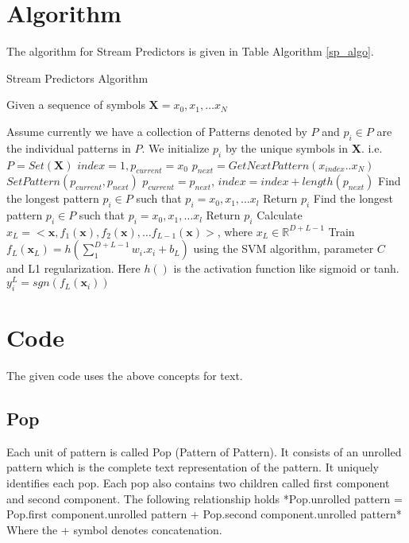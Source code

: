 \documentclass[fleqn,10pt]{olplainarticle}
\begin{document}
\section*{Algorithm}
The algorithm for Stream Predictors is given in Table Algorithm \ref{sp_algo}.
\begin{algorithm}
\caption{Stream Predictors Algorithm}
\label{sp_algo}
\begin{algorithmic}[1]
\State Given a sequence of symbols $\textbf{X} = x_0, x_1, \ldots x_N$

\State Assume currently we have a collection of Patterns denoted by $P$ and $p_i \in P$ are the individual patterns in $P$.
\State We initialize $p_i$ by the unique symbols in \textbf{X}. i.e. $P = Set(\textbf{X})$
\State $index = 1, p_{current} = x_0$
\State $p_{next} = GetNextPattern(x_{index}.. x_N)$
\State $SetPattern(p_{current}, p_{next})$
\State $p_{current} = p_{next}$, $index = index + length(p_{next})$
\EndWhile
\EndProcedure
{}
\State Find the longest pattern $p_i \in P$ such that \(p_i = x_0, x_1, \ldots x_l\)
\State Return $p_i$
\EndProcedure
{}
\State Find the longest pattern $p_i \in P$ such that $p_i = x_{0}, x_1, \ldots x_l $
\State Return $p_i$
\EndProcedure
{}
\State Calculate $x_L = <\textbf{x}, f_{1}(\textbf{x}), f_{2}(\textbf{x}), \dots f_{L-1}(\textbf{x})>$, where $x_L \in \mathbb{R}^{D+L-1}$
\EndFor
\State Train $f_L(\textbf{x}_L) = h(\sum_1^{D+L-1}w_i.x_i + b_L)$ using the SVM algorithm, parameter $C$ and L1 regularization. Here $h()$ is the activation function like sigmoid or tanh.
\State $y_i^L = sgn(f_L(\textbf{x}_i))$
\EndProcedure
\end{algorithmic}
\end{algorithm}
\section*{Code}
The given code uses the above concepts for text. 

\subsection{Pop}
Each unit of pattern is called Pop (Pattern of Pattern). It consists of an unrolled pattern which is the complete text representation of the pattern. It uniquely identifies each pop. Each pop also contains two children called first component and second component. 
The following relationship holds 
*Pop.unrolled pattern = Pop.first component.unrolled pattern + Pop.second component.unrolled pattern*
Where the + symbol denotes concatenation. 
\end{document}
